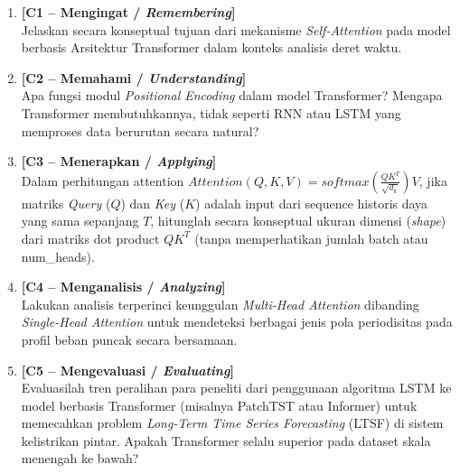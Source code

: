 \documentclass[11pt,a4paper]{article}
\begin{document}
\begin{enumerate}[leftmargin=1.8em, label=\textbf{Soal \arabic*.}]
    
    \item \textbf{[C1 -- Mengingat / \textit{Remembering}]} \\
    Jelaskan secara konseptual tujuan dari mekanisme \textit{Self-Attention} pada model berbasis Arsitektur Transformer dalam konteks analisis deret waktu.
    \vspace{2.2cm}

    \item \textbf{[C2 -- Memahami / \textit{Understanding}]} \\
    Apa fungsi modul \textit{Positional Encoding} dalam model Transformer? Mengapa Transformer membutuhkannya, tidak seperti RNN atau LSTM yang memproses data berurutan secara natural?
    \vspace{2.8cm}

    \item \textbf{[C3 -- Menerapkan / \textit{Applying}]} \\
    Dalam perhitungan attention $Attention(Q, K, V) = softmax(\frac{QK^T}{\sqrt{d_k}})V$, jika matriks \textit{Query} ($Q$) dan \textit{Key} ($K$) adalah input dari sequence historis daya yang sama sepanjang $T$, hitunglah secara konseptual ukuran dimensi (\textit{shape}) dari matriks dot product $QK^T$ (tanpa memperhatikan jumlah batch atau num\_heads).
    \vspace{2.8cm}

    \newpage

    \item \textbf{[C4 -- Menganalisis / \textit{Analyzing}]} \\
    Lakukan analisis terperinci keunggulan \textit{Multi-Head Attention} dibanding \textit{Single-Head Attention} untuk mendeteksi berbagai jenis pola periodisitas pada profil beban puncak secara bersamaan.
    \vspace{3.5cm}

    \item \textbf{[C5 -- Mengevaluasi / \textit{Evaluating}]} \\
    Evaluasilah tren peralihan para peneliti dari penggunaan algoritma LSTM ke model berbasis Transformer (misalnya PatchTST atau Informer) untuk memecahkan problem \textit{Long-Term Time Series Forecasting} (LTSF) di sistem kelistrikan pintar. Apakah Transformer selalu superior pada dataset skala menengah ke bawah?
    \vspace{3.5cm}


\end{enumerate}
\end{document}
